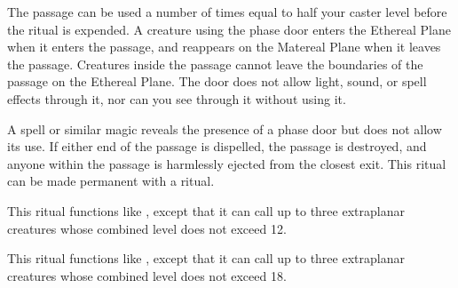 The passage can be used a number of times equal to half your caster level before the ritual is expended. A creature using the phase door enters the Ethereal Plane when it enters the passage, and reappears on the Matereal Plane when it leaves the passage. Creatures inside the passage cannot leave the boundaries of the passage on the Ethereal Plane. The door does not allow light, sound, or spell effects through it, nor can you see through it without using it.

\spellnotes A  spell or similar magic reveals the presence of a phase door but does not allow its use. If either end of the passage is dispelled, the passage is destroyed, and anyone within the passage is harmlessly ejected from the closest exit. This ritual can be made permanent with a  ritual.

\spellspecial This ritual functions like , except that it can call up to three extraplanar creatures whose combined level does not exceed 12.

\spellspecial This ritual functions like , except that it can call up to three extraplanar creatures whose combined level does not exceed 18.

